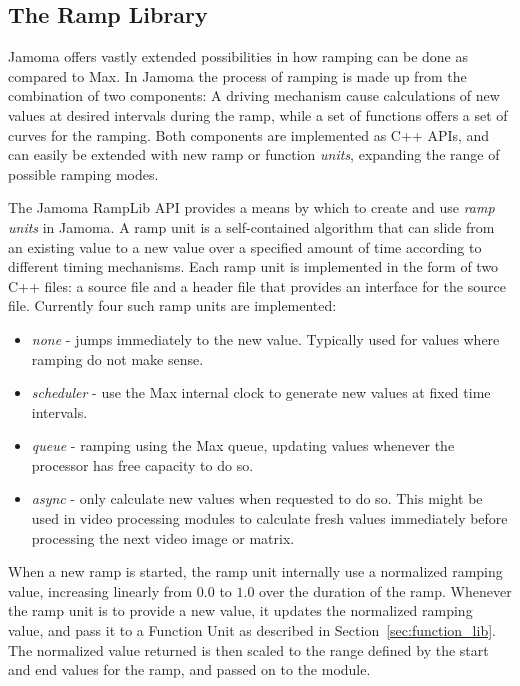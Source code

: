 \documentclass{article}
\begin{document}
\subsection{The Ramp Library}\label{sec:ramplib}

Jamoma offers vastly extended possibilities in how ramping can be done as compared to Max. In Jamoma the process of ramping is made up from the combination of two components: A driving mechanism cause calculations of new values at desired intervals during the ramp, while a set of functions offers a set of curves for the ramping. Both components are implemented as C++ APIs, and can easily be extended with new ramp or function \emph{units}, expanding the range of possible ramping modes. %

The Jamoma RampLib API provides a means by which to create and use \emph{ramp units} in Jamoma.  A ramp unit is a self-contained algorithm that can slide from an existing value to a new value over a specified amount of time according to different timing mechanisms. Each ramp unit is implemented in the form of two C++ files: a source file and a header file that provides an interface for the source file. Currently four such ramp units are implemented:

\begin{itemize}
	\item \emph{none} - jumps immediately to the new value. Typically used for values where ramping do not make sense.
	\item \emph{scheduler} - use the Max internal clock to generate new values at fixed time intervals.
	\item \emph{queue} - ramping using the Max queue, updating values whenever the processor has free capacity to do so.
	\item \emph{async} - only calculate new values when requested to do so. This might be used in video processing modules to calculate fresh values immediately before processing the next video image or matrix.
\end{itemize}

When a new ramp is started, the ramp unit internally use a normalized ramping value, increasing linearly from $0.0$ to $1.0$ over the duration of the ramp. Whenever the ramp unit is to provide a new value, it updates the normalized ramping value, and pass it to a Function Unit as described in Section~\ref{sec:function_lib}. The normalized value returned is then scaled to the range defined by the start and end values for the ramp, and passed on to the module.
\end{document}
